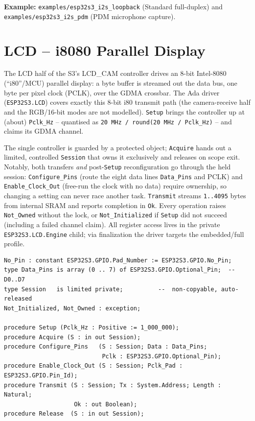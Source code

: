 \noindent\textbf{Example:} \texttt{examples/esp32s3\_i2s\_loopback} (Standard
full-duplex) and \texttt{examples/esp32s3\_i2s\_pdm} (PDM microphone capture).

\section{LCD -- i8080 Parallel Display}
\label{app:int:lcd}

The LCD half of the S3's LCD\_CAM controller drives an 8-bit Intel-8080
(``i80''/MCU) parallel display: a byte buffer is streamed out the data bus, one
byte per pixel clock (PCLK), over the GDMA crossbar. The Ada driver
(\texttt{ESP32S3.LCD}) covers exactly this 8-bit i80 transmit path (the
camera-receive half and the RGB/16-bit modes are not modelled). \texttt{Setup}
brings the controller up at (about) \texttt{Pclk\_Hz} -- quantised as
\texttt{20\,MHz / round(20\,MHz / Pclk\_Hz)} -- and claims its GDMA channel.

The single controller is guarded by a protected object; \texttt{Acquire} hands out
a limited, controlled \texttt{Session} that owns it exclusively and releases on
scope exit. Notably, both transfers \emph{and} post-\texttt{Setup} reconfiguration
go through the held session: \texttt{Configure\_Pins} (route the eight data lines
\texttt{Data\_Pins} and PCLK) and \texttt{Enable\_Clock\_Out} (free-run the clock
with no data) require ownership, so changing a setting can never race another
task. \texttt{Transmit} streams \texttt{1..4095} bytes from internal SRAM and
reports completion in \texttt{Ok}. Every operation raises \texttt{Not\_Owned}
without the lock, or \texttt{Not\_Initialized} if \texttt{Setup} did not succeed
(including a failed channel claim). All register access lives in the private
\texttt{ESP32S3.LCD.Engine} child; via finalization the driver targets the
embedded/full profile.

\begin{lstlisting}
No_Pin : constant ESP32S3.GPIO.Pad_Number := ESP32S3.GPIO.No_Pin;
type Data_Pins is array (0 .. 7) of ESP32S3.GPIO.Optional_Pin;  -- D0..D7
type Session   is limited private;          --  non-copyable, auto-released
Not_Initialized, Not_Owned : exception;

procedure Setup (Pclk_Hz : Positive := 1_000_000);
procedure Acquire (S : in out Session);
procedure Configure_Pins   (S : Session; Data : Data_Pins;
                            Pclk : ESP32S3.GPIO.Optional_Pin);
procedure Enable_Clock_Out (S : Session; Pclk_Pad : ESP32S3.GPIO.Pin_Id);
procedure Transmit (S : Session; Tx : System.Address; Length : Natural;
                    Ok : out Boolean);
procedure Release  (S : in out Session);
\end{lstlisting}


